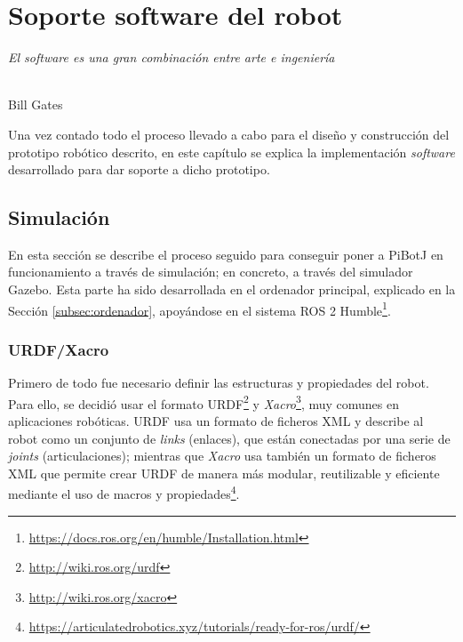 \chapter{Soporte software del robot}
\label{cap:capitulo6}

\begin{flushright}
\begin{minipage}[]{10cm}
\emph{El software es una gran combinación entre arte e ingeniería}\\
\end{minipage}\\

Bill Gates\\
\end{flushright}

\vspace{1cm}
\setcounter{footnote}{72}

Una vez contado todo el proceso llevado a cabo para el diseño y construcción del prototipo robótico descrito, en este capítulo se explica la implementación \textit{software} desarrollado para dar soporte a dicho prototipo.

\section{Simulación}
\label{sec:simulacion}

En esta sección se describe el proceso seguido para conseguir poner a PiBotJ en funcionamiento a través de simulación; en concreto, a través del simulador Gazebo. Esta parte ha sido desarrollada en el ordenador principal, explicado en la Sección \ref{subsec:ordenador}, apoyándose en el sistema ROS 2 Humble\footnote{\url{https://docs.ros.org/en/humble/Installation.html}}.

\subsection{URDF/Xacro}
\label{subsec:urdf}

Primero de todo fue necesario definir las estructuras y propiedades del robot. Para ello, se decidió usar el formato \ac{URDF}\footnote{\url{http://wiki.ros.org/urdf}} y \textit{Xacro}\footnote{\url{http://wiki.ros.org/xacro}}, muy comunes en aplicaciones robóticas. \acs{URDF} usa un formato de ficheros XML y describe al robot como un conjunto de \textit{links} (enlaces), que están conectadas por una serie de \textit{joints} (articulaciones); mientras que \textit{Xacro} usa también un formato de ficheros XML que permite crear URDF de manera más modular, reutilizable y eficiente mediante el uso de macros y propiedades\footnote{\url{https://articulatedrobotics.xyz/tutorials/ready-for-ros/urdf/}}.

